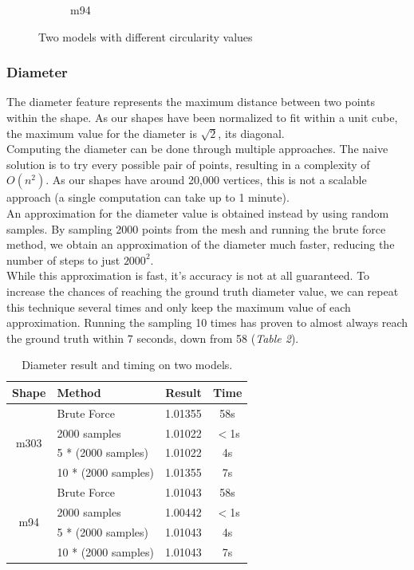 \documentclass{bigdata}
\begin{document}
\begin{figure}[h!]
\begin{subfigure}[b]{0.35\linewidth}
		\caption{m94}
	\end{subfigure}
	\caption{Two models with different circularity values}
	\label{fig:circularity}
\end{figure}
\newpage
\subsubsection{Diameter}
The diameter feature represents the maximum distance between two points within the shape. As our shapes have been normalized to fit within a unit cube, the maximum value for the diameter is $\sqrt{2}$, its diagonal. \\
Computing the diameter can be done through multiple approaches. The naive solution is to try every possible pair of points, resulting in a complexity of $O(n^2)$. As our shapes have around 20,000 vertices, this is not a scalable approach (a single computation can take up to 1 minute). \\
An approximation for the diameter value is obtained instead by using random samples. By sampling 2000 points from the mesh and running the brute force method, we obtain an approximation of the diameter much faster, reducing the number of steps to just $2000^2$. \\
While this approximation is fast, it's accuracy is not at all guaranteed. To increase the chances of reaching the ground truth diameter value, we can repeat this technique several times and only keep the maximum value of each approximation. Running the sampling 10 times has proven to almost always reach the ground truth within 7 seconds, down from 58 (\textit{Table 2}).

\begin{table}[h!]
	\begin{center}
		\begin{tabular}{c|l|c|c} %
			\textbf{Shape} & \textbf{Method} & \textbf{Result} & \textbf{Time} \\
			\hline
\multirow{4}{3em}{m303}& Brute Force & 1.01355 & 58s\\
				  & 2000 samples & 1.01022 & $<$1s\\
				  & 5 * (2000 samples) & 1.01022 & 4s\\
				  & 10 * (2000 samples) & 1.01355 & 7s\\
			\hline
\multirow{4}{3em}{m94}& Brute Force & 1.01043 & 58s\\
				  & 2000 samples & 1.00442 & $<$1s\\
				  & 5 * (2000 samples) & 1.01043 & 4s\\
				  & 10 * (2000 samples) & 1.01043 & 7s
		\end{tabular}
	\end{center}
	\caption{Diameter result and timing on two models.}
	\label{Table 3,}
\end{table}
\end{document}
